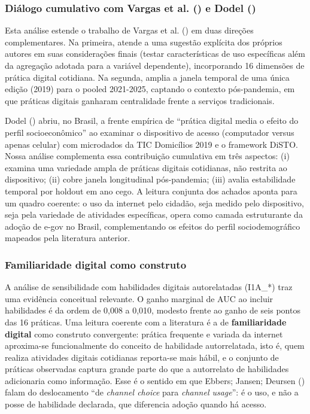 \documentclass[
  man,
  floatsintext,
  longtable,
  a4paper,
  nolmodern,
  notxfonts,
  notimes,
  colorlinks=true,linkcolor=blue,citecolor=blue,urlcolor=blue]{apa7}
\begin{document}
\subsubsection{\texorpdfstring{Diálogo cumulativo com Vargas et al.
() e Dodel
()}{Diálogo cumulativo com Vargas et al. (2021) e Dodel (2023)}}\label{diuxe1logo-cumulativo-com-vargas2021-e-dodel2023whydevic}

Esta análise estende o trabalho de Vargas et al.
() em duas direções complementares. Na
primeira, atende a uma sugestão explícita dos próprios autores em suas
considerações finais (testar características de uso específicas além da
agregação adotada para a variável dependente), incorporando 16 dimensões
de prática digital cotidiana. Na segunda, amplia a janela temporal de
uma única edição (2019) para o pooled 2021-2025, captando o contexto
pós-pandemia, em que práticas digitais ganharam centralidade frente a
serviços tradicionais.

Dodel () abriu, no Brasil, a
frente empírica de ``prática digital media o efeito do perfil
socioeconômico'' ao examinar o dispositivo de acesso (computador versus
apenas celular) com microdados da TIC Domicílios 2019 e o framework
DiSTO. Nossa análise complementa essa contribuição cumulativa em três
aspectos: (i) examina uma variedade ampla de práticas digitais
cotidianas, não restrita ao dispositivo; (ii) cobre janela longitudinal
pós-pandemia; (iii) avalia estabilidade temporal por holdout em ano
cego. A leitura conjunta dos achados aponta para um quadro coerente: o
uso da internet pelo cidadão, seja medido pelo dispositivo, seja pela
variedade de atividades específicas, opera como camada estruturante da
adoção de e-gov no Brasil, complementando os efeitos do perfil
sociodemográfico mapeados pela literatura anterior.

\subsubsection{Familiaridade digital como
construto}\label{familiaridade-digital-como-construto}

A análise de sensibilidade com habilidades digitais autorelatadas
(I1A\_*) traz uma evidência conceitual relevante. O ganho marginal de
AUC ao incluir habilidades é da ordem de 0,008 a 0,010, modesto frente
ao ganho de seis pontos das 16 práticas. Uma leitura coerente com a
literatura é a de \textbf{familiaridade digital} como construto
convergente: prática frequente e variada da internet aproxima-se
funcionalmente do conceito de habilidade autorrelatada, isto é, quem
realiza atividades digitais cotidianas reporta-se mais hábil, e o
conjunto de práticas observadas captura grande parte do que a
autorrelato de habilidades adicionaria como informação. Esse é o sentido
em que Ebbers; Jansen; Deursen ()
falam do deslocamento ``de \emph{channel choice} para \emph{channel
usage}'': é o uso, e não a posse de habilidade declarada, que diferencia
adoção quando há acesso.
\end{document}
